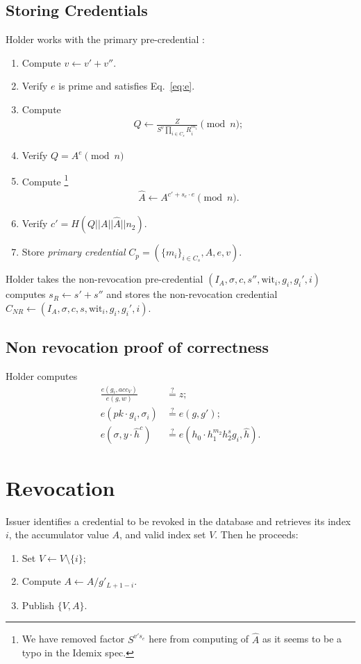 \subsection{Storing Credentials}
Holder works with the primary pre-credential :
\begin{enumerate}
\item Compute $v \leftarrow v'+v''$.
\item Verify $e$ is prime and satisfies Eq.~\eqref{eq:e}.
\item Compute
\begin{align}
Q\leftarrow \frac{Z}{S^v\prod_{i \in C_s}R_i^{m_i}}\pmod{n};
\end{align}
\item Verify $Q = A^e\pmod{n}$
\item Compute
\footnote{We have removed factor $S^{v's_e}$ here from computing of $\widehat{A}$ as it seems to be a typo in the Idemix spec.}
\begin{align}
\widehat{A}\leftarrow A^{c'+s_e\cdot e} \pmod{n}.
\end{align}
\item Verify $c'=H(Q||A||\widehat{A}||n_2).$
\item Store \emph{primary credential} $C_p=(\{m_i\}_{i \in C_s},A,e,v)$.
\end{enumerate}
Holder takes the non-revocation pre-credential $(I_A,\sigma,c,s'',\mathrm{wit}_i,g_i,g_i',i)$ computes $s_R \leftarrow s'+s''$ and stores the non-revocation credential $C_{NR}\leftarrow(I_A,\sigma,c,s,\mathrm{wit}_i,g_i,g_i',i)$.
\subsection{Non revocation proof of correctness} Holder computes
\begin{align}
\frac{e(g_i,acc_V)}{e(g,w)} &\overset{\text{?}}{=} z;\\
e(pk\cdot g_i, \sigma_i) &\overset{\text{?}}{=} e(g,g');\\
e(\sigma,y\cdot \widehat{h}^c)& \overset{\text{?}}{=} e(h_0 \cdot h_1^{m_2}h_2^{s}g_i,\widehat{h}).
\end{align}
    

\section{Revocation}
Issuer identifies a credential to be revoked in the database and retrieves its index $i$, the  accumulator value $A$, and valid index set $V$. Then he proceeds:
\begin{enumerate}
\item Set $V\leftarrow V\setminus\{i\}$;
\item Compute $A \leftarrow A/g'_{L+1-i}$.
\item Publish $\{V,A\}$.
\end{enumerate}
    
